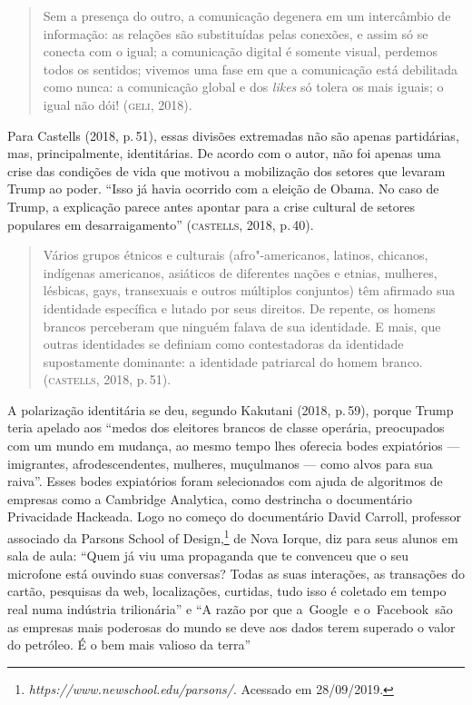 \begin{quote}
Sem a presença do outro, a comunicação degenera em um intercâmbio de
informação: as relações são substituídas pelas conexões, e assim só se
conecta com o igual; a comunicação digital é somente visual, perdemos
todos os sentidos; vivemos uma fase em que a comunicação está debilitada
como nunca: a comunicação global e dos \emph{likes} só tolera os mais
iguais; o igual não dói! (\textsc{geli}, 2018).
\end{quote}

Para Castells (2018, p.\,51), essas divisões extremadas não são apenas
partidárias, mas, principalmente, identitárias. De acordo com o autor,
não foi apenas uma crise das condições de vida que motivou a mobilização
dos setores que levaram Trump ao poder. ``Isso já havia ocorrido com a
eleição de Obama. No caso de Trump, a explicação parece antes apontar
para a crise cultural de setores populares em desarraigamento''
(\textsc{castells}, 2018, p.\,40).

\begin{quote}
Vários grupos étnicos e culturais (afro"-americanos, latinos, chicanos,
indígenas americanos, asiáticos de diferentes nações e etnias, mulheres,
lésbicas, gays, transexuais e outros múltiplos conjuntos) têm afirmado
sua identidade específica e lutado por seus direitos. De repente, os
homens brancos perceberam que ninguém falava de sua identidade. E mais,
que outras identidades se definiam como contestadoras da identidade
supostamente dominante: a identidade patriarcal do homem branco.
(\textsc{castells}, 2018, p.\,51).
\end{quote}

A polarização identitária se deu, segundo Kakutani (2018, p.\,59), porque
Trump teria apelado aos ``medos dos eleitores brancos de classe
operária, preocupados com um mundo em mudança, ao mesmo tempo lhes
oferecia bodes expiatórios --- imigrantes, afrodescendentes, mulheres,
muçulmanos --- como alvos para sua raiva''. Esses bodes expiatórios foram
selecionados com ajuda de algoritmos de empresas como a Cambridge
Analytica, como destrincha o documentário Privacidade Hackeada. Logo no
começo do documentário David Carroll, professor associado da Parsons
School of Design,\footnote{\emph{https://www.newschool.edu/parsons/}.
  Acessado em 28/09/2019.} de Nova Iorque, diz para seus alunos em sala
de aula: ``Quem já viu uma propaganda que te convenceu que o seu
microfone está ouvindo suas conversas? Todas as suas interações, as
transações do cartão, pesquisas da web, localizações, curtidas, tudo
isso é coletado em tempo real numa indústria trilionária'' e ``A razão por
que a~Google~e o~Facebook~são as empresas mais poderosas do mundo se
deve aos dados terem superado o valor do petróleo. É o bem mais valioso
da terra''

